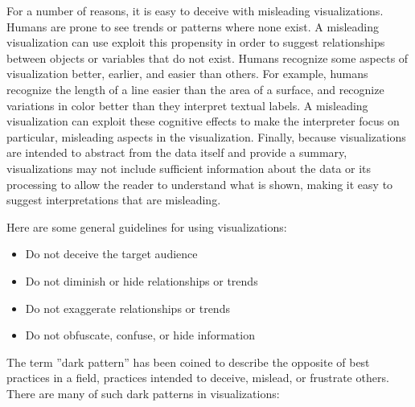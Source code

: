 For a number of reasons, it is easy to deceive with misleading visualizations. Humans are prone to see trends or patterns where none exist. A misleading visualization can use exploit this propensity in order to suggest relationships between objects or variables that do not exist. Humans recognize some aspects of visualization better, earlier, and easier than others. For example, humans recognize the length of a line easier than the area of a surface, and recognize variations in color better than they interpret textual labels. A misleading visualization can exploit these cognitive effects to make the interpreter focus on particular, misleading aspects in the visualization. Finally, because visualizations are intended to abstract from the data itself and provide a summary, visualizations may not include sufficient information about the data or its processing to allow the reader to understand what is shown, making it easy to suggest interpretations that are misleading.

Here are some general guidelines for using visualizations:
\begin{itemize}
   \item Do not deceive the target audience
   \item Do not diminish or hide relationships or trends
   \item Do not exaggerate relationships or trends
   \item Do not obfuscate, confuse, or hide information
\end{itemize}

The term ''dark pattern'' has been coined to describe the opposite of best practices in a field, practices intended to deceive, mislead, or frustrate others. There are many of such dark patterns in visualizations:

